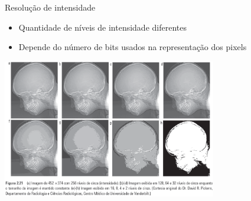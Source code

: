    \begin{slide}[toc=]{Resolução de intensidade}
   \begin{itemize}
    \item Quantidade de níveis de intensidade diferentes
    \item Depende do número de bits usados na representação dos pixels
   \end{itemize}
        \begin{center}
          \includegraphics[width=0.7\textwidth]{figs/fig0221}
        \end{center}
   \end{slide}

